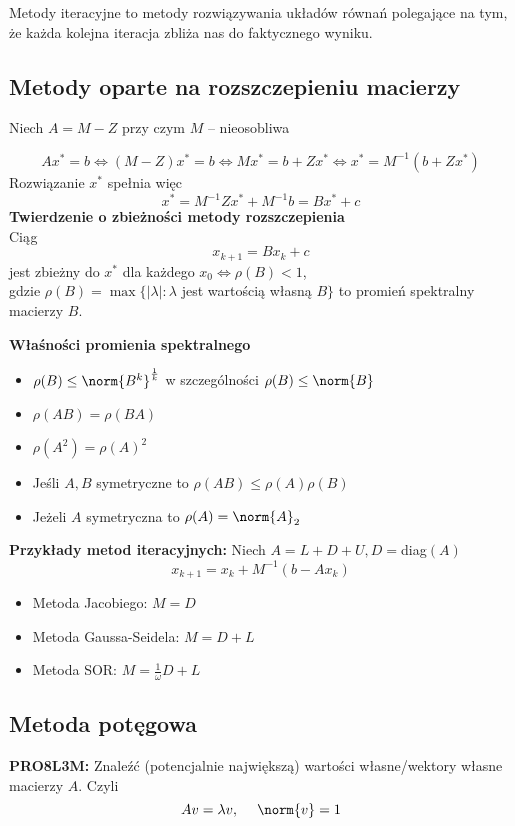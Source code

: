 Metody iteracyjne to metody rozwiązywania układów równań polegające na tym, że każda kolejna iteracja zbliża nas do faktycznego wyniku.

\subsection{Metody oparte na rozszczepieniu macierzy}
Niech $A=M-Z$ przy czym $M$ -- nieosobliwa

$$
Ax^* = b \iff (M-Z)x^* = b \iff Mx^*=b+Zx^* \iff x^* = M^{-1}(b + Zx^*)
$$
Rozwiązanie $x^*$ spełnia więc
$$
x^* = M^{-1}Z x^* + M^{-1}b = B x^* + c
$$
\textbf{Twierdzenie o zbieżności metody rozszczepienia}\\

Ciąg
$$
x_{k+1} = Bx_k + c
$$
jest zbieżny do $x^*$ dla każdego $x_0 \iff \rho(B) < 1$,\\
gdzie $\rho(B) = \max\{ |\lambda| : \lambda$ jest wartością własną $B\}$ to promień spektralny macierzy $B$.

\textbf{Właśności promienia spektralnego}\\
\begin{itemize}
    \item $\rho(B) \leq \norm{B^k}^{\frac{1}{k}}$ w szczególności $\rho(B) \leq \norm{B}$

    \item $\rho(AB) = \rho(BA)$

    \item $\rho(A^2) = \rho(A)^2$

    \item Jeśli $A,B$ symetryczne to $\rho(AB) \leq \rho(A) \rho(B)$

    \item Jeżeli $A$ symetryczna to $\rho(A) = \norm{A}_2$
\end{itemize}

\textbf{Przykłady metod iteracyjnych:}
Niech $A = L + D + U, D = $diag$(A)$
$$
x_{k+1} = x_k + M^{-1}(b-Ax_k)
$$
\begin{itemize}
    \item Metoda Jacobiego: $M = D$

    \item Metoda Gaussa-Seidela: $M = D + L$

    \item Metoda SOR: $M = \frac{1}{\omega}D + L$
\end{itemize}

\subsection{Metoda potęgowa}
\textbf{PRO8L3M:} Znaleźć (potencjalnie największą) wartości własne/wektory własne macierzy $A$. Czyli
$$
Av=\lambda v,   \quad \; \norm{v}= 1
$$\\

